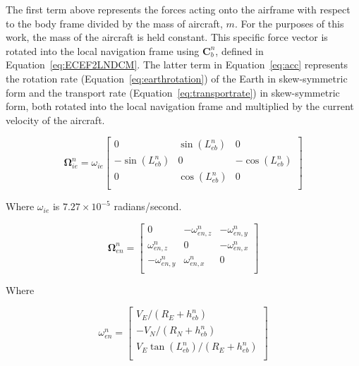The first term above represents the forces acting onto the airframe with respect to the body frame divided by the mass of aircraft, \(m\). For the purposes of this work, the mass of the aircraft is held constant. This specific force vector is rotated into the local navigation frame using \(\mathbf{C}_b^n\), defined in Equation~\ref{eq:ECEF2LNDCM}. The latter term in Equation~\ref{eq:acc} represents the rotation rate (Equation~\ref{eq:earthrotation}) of the Earth in skew-symmetric form and the transport rate (Equation~\ref{eq:transportrate}) in skew-symmetric form, both rotated into the local navigation frame and multiplied by the current velocity of the aircraft.

\begin{equation}\label{eq:earthrotation}
    \mathbf{\Omega}_{ie}^n =
    \omega_{ie}\begin{bmatrix}
        0                          & \sin\left(L_{eb}^n\right) & 0                          \\
        -\sin\left(L_{eb}^n\right) & 0                         & -\cos\left(L_{eb}^n\right) \\
        0                          & \cos\left(L_{eb}^n\right) & 0                          \\
    \end{bmatrix}
\end{equation}

Where \(\omega_{ie}\) is \(7.27\times10^{-5}\) radians/second.

\begin{equation}\label{eq:transportrate}
    \mathbf{\Omega}_{en}^n = \begin{bmatrix}
        0                & -\omega_{en,z}^n & -\omega_{en,y}^n \\
        \omega_{en,z}^n  & 0                & -\omega_{en,x}^n \\
        -\omega_{en,y}^n & \omega_{en,x}^n  & 0                \\
    \end{bmatrix}
\end{equation}

Where

\begin{equation}\label{eq:omega_en_n}
    \omega_{en}^n =
    \begin{bmatrix}
        V_E/(R_E + h_{eb}^n)               \\
        -V_N/(R_N + h_{eb}^n)              \\
        V_E\tan(L_{eb}^n)/(R_E + h_{eb}^n) \\
    \end{bmatrix}
\end{equation}

